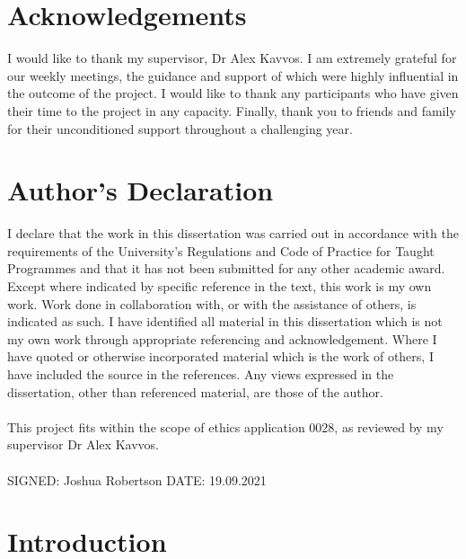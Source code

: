 \documentclass[12pt]{article}
\begin{document}
	\pagebreak

	\section*{Acknowledgements}
	
	
	I would like to thank my supervisor, Dr Alex Kavvos. I am extremely grateful for our weekly meetings, the guidance and support of which were highly influential in the outcome of the project. I would like to thank any participants who have given their time to the project in any capacity. Finally, thank you to friends and family for their unconditioned support throughout a challenging year.
	
	\pagebreak
	
	\section*{Author's Declaration}

	I declare that the work in this dissertation was carried out in accordance with the 
	requirements of the University’s Regulations and Code of Practice for Taught Programmes 
	and that it has not been submitted for any other academic award. Except where indicated 
	by specific reference in the text, this work is my own work. Work done in collaboration with, 
	or with the assistance of others, is indicated as such. I have identified all material in this 
	dissertation which is not my own work through appropriate referencing and 
	acknowledgement. Where I have quoted or otherwise incorporated material which is the 
	work of others, I have included the source in the references. Any views expressed in the 
	dissertation, other than referenced material, are those of the author. 
	\\
	\\
	This project fits within the scope of ethics application 0028, as reviewed by my supervisor Dr Alex Kavvos.
	\\
	\\
	SIGNED: Joshua Robertson DATE: 19.09.2021 
	
	\pagebreak
	
	{
		\hypersetup{linkcolor=black}
		\tableofcontents
		\pagebreak
	
		\listoffigures
		\pagebreak
	}
	
	
	
	
	\section{Introduction}
\end{document}
